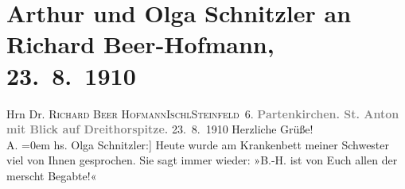 

         
         \renewcommand{\erwaehntePersonen}{Personen: Richard Beer-Hofmann, Elisabeth Steinrück}
         \renewcommand{\erwaehnteOrte}{Orte: Bad Ischl, Dreitorspitze, Frankfurt am Main, Garmisch-Partenkirchen, Heidelberg, Partenkirchen, St. Anton, Steinfeld}
         \renewcommand{\erwaehnteWerke}{Werke: Liebelei. Oper in drei Akten}
               \section[Arthur und Olga Schnitzler an Richard Beer-Hofmann, 23. 8. 1910]{ Arthur und Olga Schnitzler an Richard Beer-Hofmann, 23. 8. 1910}\nopagebreak{}\rehead{ }\begin{ledgroupsized}[t]{13cm}\normalsize\beginnumbering \toendnotes[C]{\smallbreak\pagebreak[2]} 
\toendnotes[C]{\smallbreak}\pstart{}{\pb}Hrn Dr. \textsc{Richard Beer
                     Hofmann}\pend{}\pstart{}\textsc{Ischl}\pend{}\pstart{}\textsc{Steinfeld\strikeout{\textcolor{gray}{gass}} 6}.\pend{}{\bigskip}\pstart
           \noindent{}\centering{}{\pb}\textcolor{gray}{\textbf{Partenkirchen. St. Anton mit Blick auf Dreithorspitze.}}\pend
           \pstart
           \centering{}{\pb}23. 8. 1910\pend
           \pstart
           Herzliche Grüße!{\\[\baselineskip]}\spacefill\mbox{A.}\pend
           \leftskip=0em{}\pstart
           \noindent{}{[}hs. Olga Schnitzler:{]} Heute wurde am Krankenbett meiner Schwester viel von Ihnen gesprochen. Sie sagt
               immer wieder: »B.-H. ist von Euch allen der merscht Begabte!«\pend

\end{ledgroupsized}
